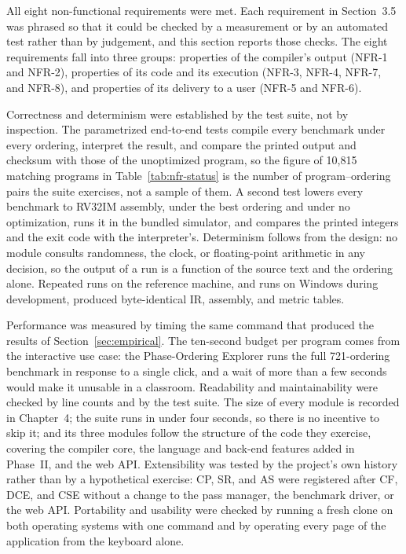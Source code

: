 All eight non-functional requirements were met. Each requirement in Section~3.5 was phrased so that it could be checked by a measurement or by an automated test rather than by judgement, and this section reports those checks. The eight requirements fall into three groups: properties of the compiler's output (NFR-1 and NFR-2), properties of its code and its execution (NFR-3, NFR-4, NFR-7, and NFR-8), and properties of its delivery to a user (NFR-5 and NFR-6).

Correctness and determinism were established by the test suite, not by inspection. The parametrized end-to-end tests compile every benchmark under every ordering, interpret the result, and compare the printed output and checksum with those of the unoptimized program, so the figure of 10{,}815 matching programs in Table~\ref{tab:nfr-status} is the number of program--ordering pairs the suite exercises, not a sample of them. A second test lowers every benchmark to RV32IM assembly, under the best ordering and under no optimization, runs it in the bundled simulator, and compares the printed integers and the exit code with the interpreter's. Determinism follows from the design: no module consults randomness, the clock, or floating-point arithmetic in any decision, so the output of a run is a function of the source text and the ordering alone. Repeated runs on the reference machine, and runs on Windows during development, produced byte-identical IR, assembly, and metric tables.

Performance was measured by timing the same command that produced the results of Section~\ref{sec:empirical}. The ten-second budget per program comes from the interactive use case: the Phase-Ordering Explorer runs the full 721-ordering benchmark in response to a single click, and a wait of more than a few seconds would make it unusable in a classroom. Readability and maintainability were checked by line counts and by the test suite. The size of every module is recorded in Chapter~4; the suite runs in under four seconds, so there is no incentive to skip it; and its three modules follow the structure of the code they exercise, covering the compiler core, the language and back-end features added in Phase~II, and the web API. Extensibility was tested by the project's own history rather than by a hypothetical exercise: CP, SR, and AS were registered after CF, DCE, and CSE without a change to the pass manager, the benchmark driver, or the web API. Portability and usability were checked by running a fresh clone on both operating systems with one command and by operating every page of the application from the keyboard alone.


